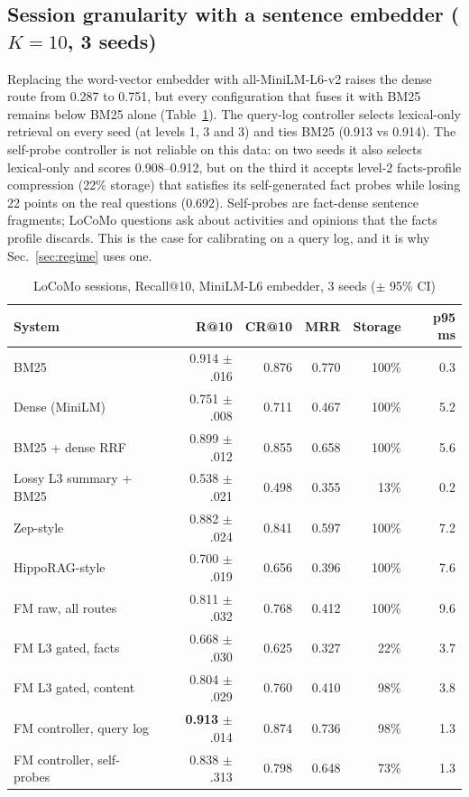 \documentclass[journal]{IEEEtran}
\begin{document}
\subsection{Session granularity with a sentence embedder ($K=10$, 3 seeds)}
\label{sec:minilm}
Replacing the word-vector embedder with all-MiniLM-L6-v2 raises the dense route from 0.287 to 0.751, but every configuration that fuses it with BM25 remains below BM25 alone (Table~\ref{tab:locomo10}). The query-log controller selects lexical-only retrieval on every seed (at levels 1, 3 and 3) and ties BM25 (0.913 vs 0.914). The self-probe controller is not reliable on this data: on two seeds it also selects lexical-only and scores 0.908--0.912, but on the third it accepts level-2 facts-profile compression (22\% storage) that satisfies its self-generated fact probes while losing 22 points on the real questions (0.692). Self-probes are fact-dense sentence fragments; LoCoMo questions ask about activities and opinions that the facts profile discards. This is the case for calibrating on a query log, and it is why Sec.~\ref{sec:regime} uses one.

\begin{table}[t]
\caption{LoCoMo sessions, Recall@10, MiniLM-L6 embedder, 3 seeds ($\pm$ 95\% CI)}
\label{tab:locomo10}
\centering
\scriptsize
\begin{tabular}{lrrrrr}
\toprule
System & R@10 & CR@10 & MRR & Storage & p95 ms \\
\midrule
BM25 & 0.914 $\pm$.016 & 0.876 & 0.770 & 100\% & 0.3 \\
Dense (MiniLM) & 0.751 $\pm$.008 & 0.711 & 0.467 & 100\% & 5.2 \\
BM25 + dense RRF & 0.899 $\pm$.012 & 0.855 & 0.658 & 100\% & 5.6 \\
Lossy L3 summary + BM25 & 0.538 $\pm$.021 & 0.498 & 0.355 & 13\% & 0.2 \\
Zep-style & 0.882 $\pm$.024 & 0.841 & 0.597 & 100\% & 7.2 \\
HippoRAG-style & 0.700 $\pm$.019 & 0.656 & 0.396 & 100\% & 7.6 \\
FM raw, all routes & 0.811 $\pm$.032 & 0.768 & 0.412 & 100\% & 9.6 \\
FM L3 gated, facts & 0.668 $\pm$.030 & 0.625 & 0.327 & 22\% & 3.7 \\
FM L3 gated, content & 0.804 $\pm$.029 & 0.760 & 0.410 & 98\% & 3.8 \\
FM controller, query log & \textbf{0.913} $\pm$.014 & 0.874 & 0.736 & 98\% & 1.3 \\
FM controller, self-probes & 0.838 $\pm$.313 & 0.798 & 0.648 & 73\% & 1.3 \\
\bottomrule
\end{tabular}
\end{table}
\end{document}
